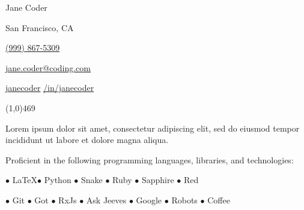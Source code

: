 \documentclass[11pt]{article}
\begin{document}

\centerline{{\Huge \sc Jane Coder}}
\medskip
\centerline{\hspace{5pt}San Francisco, CA}
\smallskip
\centerline{\hspace{5pt}\href{tel:19998765309}{(999) 867-5309}}
\smallskip
\centerline{\hspace{5pt}\href{mailto:jane.coder@coding.com}{ jane.coder@coding.com}}
\smallskip
\centerline{\hspace{5pt}\href{https://github.com/<ADD YOUR GITHUB URL>}{ janecoder} \textbullet \hspace{5pt}\href{https://www.linkedin.com/in/<ADD YOUR LINKEDIN URL>/}{ /in/janecoder}}

\noindent\line(1,0){469}
\bigskip



\medskip

Lorem ipsum dolor sit amet, consectetur adipiscing elit, sed do eiusmod tempor incididunt ut labore et dolore magna aliqua.

\smallskip
Proficient in the following programming languages, libraries, and technologies:

\centerline{\hfill $\bullet$ \LaTeX \hfill $\bullet$ Python \hfill $\bullet$ Snake \hfill $\bullet$ Ruby \hfill $\bullet$ Sapphire \hfill $\bullet$ Red \hfill}
\smallskip
\centerline{\hfill $\bullet$ Git \hfill $\bullet$ Got \hfill $\bullet$ RxJs \hfill $\bullet$ Ask Jeeves \hfill $\bullet$ Google \hfill $\bullet$ Robots \hfill $\bullet$ Coffee \hfill}
\bigskip


%
\medskip
\end{document}
